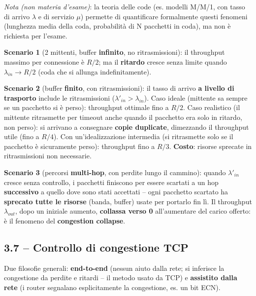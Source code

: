 \documentclass[12pt, a4paper]{article}
\begin{document}
\textit{Nota (non materia d'esame)}: la teoria delle code (es. modelli M/M/1, con tasso di arrivo $\lambda$ e di servizio $\mu$) permette di quantificare formalmente questi fenomeni (lunghezza media della coda, probabilità di N pacchetti in coda), ma non è richiesta per l'esame.

\begin{tcolorbox}[colback=lightergray!10, colframe=tocsec, title=\textbf{I tre scenari classici dei costi della congestione}]
\textbf{Scenario 1} (2 mittenti, buffer \textbf{infinito}, no ritrasmissioni): il throughput massimo per connessione è $R/2$; ma il \textbf{ritardo} cresce senza limite quando $\lambda_{in}\to R/2$ (coda che si allunga indefinitamente).

\textbf{Scenario 2} (buffer \textbf{finito}, con ritrasmissioni): il tasso di arrivo \textbf{a livello di trasporto} include le ritrasmissioni ($\lambda'_{in} > \lambda_{in}$). Caso ideale (mittente sa sempre se un pacchetto si è perso): throughput ottimale fino a $R/2$. Caso realistico (il mittente ritrasmette per timeout anche quando il pacchetto era solo in ritardo, non perso): si arrivano a consegnare \textbf{copie duplicate}, dimezzando il throughput utile (fino a $R/4$). Con un'idealizzazione intermedia (si ritrasmette solo se il pacchetto è sicuramente perso): throughput fino a $R/3$. \textbf{Costo}: risorse sprecate in ritrasmissioni non necessarie.

\textbf{Scenario 3} (percorsi \textbf{multi-hop}, con perdite lungo il cammino): quando $\lambda'_{in}$ cresce senza controllo, i pacchetti finiscono per essere scartati a un hop \textbf{successivo} a quello dove sono stati accettati -- ogni pacchetto scartato ha \textbf{sprecato tutte le risorse} (banda, buffer) usate per portarlo fin lì. Il throughput $\lambda_{out}$, dopo un iniziale aumento, \textbf{collassa verso 0} all'aumentare del carico offerto: è il fenomeno del \textbf{congestion collapse}.
\end{tcolorbox}

\subsection{3.7 -- Controllo di congestione TCP}

Due filosofie generali: \textbf{end-to-end} (nessun aiuto dalla rete; si inferisce la congestione da perdite e ritardi -- il metodo usato da TCP) e \textbf{assistito dalla rete} (i router segnalano esplicitamente la congestione, es. un bit ECN).
\end{document}
